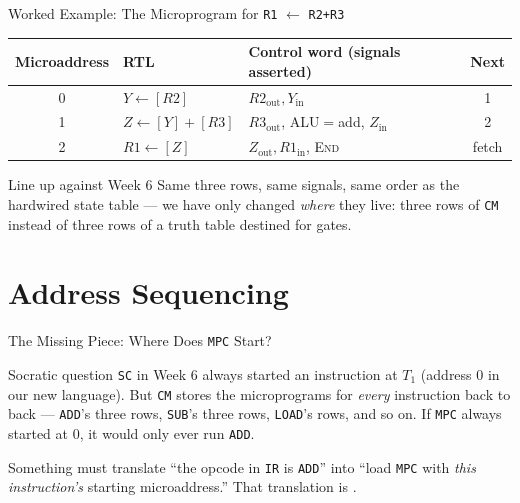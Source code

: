 \documentclass[aspectratio=169]{beamer}
\begin{document}
\begin{frame}{Worked Example: The Microprogram for \texttt{R1} $\gets$ \texttt{R2+R3}}
  \footnotesize
  \begin{tabular}{@{}cllc@{}}
    \toprule
    \textbf{Microaddress} & \textbf{RTL} & \textbf{Control word (signals asserted)} & \textbf{Next} \\
    \midrule
    0 & $Y \gets [R2]$            & $R2_{\text{out}}, Y_{\text{in}}$                 & 1 \\
    1 & $Z \gets [Y] + [R3]$      & $R3_{\text{out}}$, ALU$=$add, $Z_{\text{in}}$    & 2 \\
    2 & $R1 \gets [Z]$            & $Z_{\text{out}}, R1_{\text{in}}$, \textsc{End}   & fetch \\
    \bottomrule
  \end{tabular}
  \vspace{0.3cm}
  \begin{exampleblock}{Line up against Week 6}
    Same three rows, same signals, same order as the hardwired state table
    --- we have only changed \emph{where} they live: three rows of \texttt{CM}
    instead of three rows of a truth table destined for gates.
  \end{exampleblock}
\end{frame}


\section{Address Sequencing}

\begin{frame}{The Missing Piece: Where Does \texttt{MPC} Start?}
  \begin{block}{Socratic question}
    \texttt{SC} in Week 6 always started an instruction at $T_1$ (address 0
    in our new language). But \texttt{CM} stores the microprograms for
    \emph{every} instruction back to back --- \texttt{ADD}'s three rows,
    \texttt{SUB}'s three rows, \texttt{LOAD}'s rows, and so on. If \texttt{MPC}
    always started at 0, it would only ever run \texttt{ADD}.
  \end{block}
  Something must translate ``the opcode in \texttt{IR} is \texttt{ADD}''
  into ``load \texttt{MPC} with \emph{this instruction's} starting
  microaddress.'' That translation is .
\end{frame}
\end{document}
